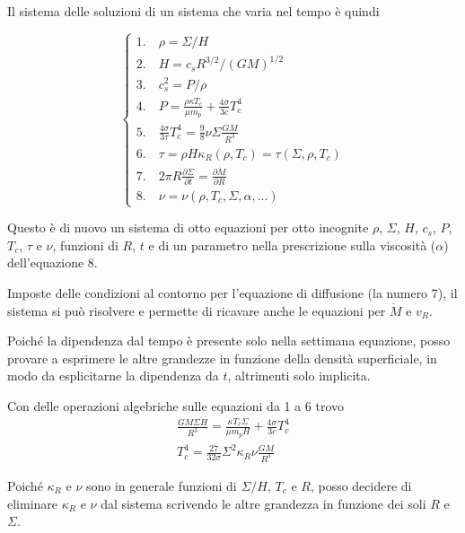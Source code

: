 \documentclass[a4paperbi]{article}
\begin{document}
	\newpage
	Il sistema delle soluzioni di un sistema che varia nel tempo è quindi
	
	\begin{spacing}{1.3}
	\begin{equation}
	\begin{cases}
		1.\quad \rho=\Sigma/H\\
		2.\quad H=c_sR^{3/2}/(GM)^{1/2}\\
		3.\quad c_s^2=P/\rho\\
		4.\quad P=\frac{\rho\kappa T_c}{\mu m_p}+\frac{4\sigma}{3c}T_c^4\\
		5.\quad \frac{4\sigma}{3\tau}T_c^4=\frac{9}{8}\nu\Sigma\frac{GM}{R^3}\\
		6.\quad \tau=\rho H\kappa_R(\rho,T_c)=\tau(\Sigma,\rho,T_c)\\
		7.\quad 2\pi R\frac{\partial \Sigma}{\partial t}=\frac{\partial\dot{M}}{\partial R}\\
		8.\quad \nu=\nu(\rho,T_c,\Sigma,\alpha,...)		
	\end{cases}
	\end{equation}
	\end{spacing}
	
	Questo è di nuovo un sistema di otto equazioni per otto incognite $\rho$, $\Sigma$, $H$, $c_s$, $P$, $T_c$, $\tau$ e $\nu$, funzioni di $R$, $t$ e di un parametro nella prescrizione sulla viscosità ($\alpha$) dell'equazione 8. 
	
	Imposte delle condizioni al contorno per l'equazione di diffusione (la numero 7), il sistema si può risolvere e permette di ricavare anche le equazioni per $\dot{M}$ e $v_R$.
	
	Poiché la dipendenza dal tempo è presente solo nella settimana equazione, posso provare a esprimere le altre grandezze in funzione della densità superficiale, in modo da esplicitarne la dipendenza da $t$, altrimenti solo implicita.
	
	Con delle operazioni algebriche sulle equazioni da 1 a 6 trovo
	\begin{gather}
		\frac{GM\Sigma H}{R^3}=\frac{\kappa T_c\Sigma}{\mu m_p H}+\frac{4\sigma}{3c}T_c^4\\
		T^4_c=\frac{27}{32\sigma}\Sigma^2\kappa_R\nu\frac{GM}{R^3}
	\end{gather}
	
	Poiché $\kappa_R$ e $\nu$ sono in generale funzioni di $\Sigma/H$, $T_c$ e $R$, posso decidere di eliminare $\kappa_R$ e $\nu$ dal sistema scrivendo le altre grandezza in funzione dei soli $R$ e $\Sigma$.
		
\end{document}
